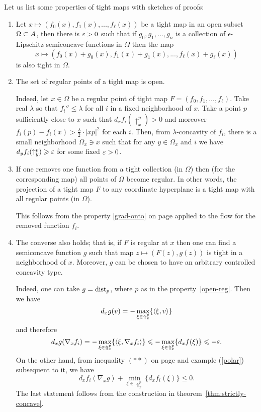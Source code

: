 \documentclass{article}
\begin{document}
Let us list some properties of tight maps with sketches of proofs:
\begin{enumerate}
\item\label{lip+} 
Let $x\mapsto(f_0(x),f_1(x),...,f_\ell(x))$ be a tight map in an open subset $\Omega\subset A$, then there is $\varepsilon>0$ such that if $g_0,g_1,...,g_n$ is a collection of
$\epsilon$-Lipschitz semiconcave functions in $\Omega$ then the map 
$$x\mapsto (f_0(x)+g_0(x),f_1(x)+g_1(x),...,f_\ell(x)+g_\ell(x))$$
is also tight in $\Omega$.
\item \label{open-reg}The set of regular points of a tight map is open. 

Indeed, let $x\in\Omega$ be a regular point of tight map $F=(f_0,f_1,\dots,f_\ell)$. 
Take real $\lambda$ so that $f_i''\le \lambda$ for all $i$ in a fixed neighborhood of
$x$.
Take a point $p$ sufficiently close to $x$ such that $d_x f_i(\uparrow_x^p)>0$
and moreover $f_i(p)-f_i(x)>\tfrac\lambda2{\cdot}
|x p|^2$ for each $i$.
Then, from $\lambda$-concavity of $f_i$, there is a small neighborhood
$\Omega_x\ni x$ such that for any $y\in\Omega_x$ and $i$ we have $d_y
f_i(\uparrow_y^p)\geqslant\varepsilon$
for some fixed $\varepsilon>0$.

\item \label{minus-funct}If one removes one function from a tight
collection (in $\Omega$) then (for the corresponding map) all points of $\Omega$ become
regular. 
In other words, the projection of a tight map $F$ to any coordinate
hyperplane is a tight map with all regular points (in $\Omega$).

This follows from the property \ref{grad-onto} on page \pageref{grad-onto}
applied to the flow for the removed function $f_i$.

\item \label{extra-funct} 
The converse also holds;
that is,
if $F$ is regular at $x$ then
one can find a semiconcave function $g$ such that map $z\mapsto(F(z),g(z))$ is
tight in a neighborhood of $x$.
Moreover, $g$ can be chosen to have an arbitrary controlled concavity type.

Indeed, one can take $g=\operatorname{dist}_p$, where $p$ as in the property~\ref{open-reg}.
Then we have 
$$d_x g(v)=-\max_{\xi\in\Uparrow_x^p}\{\langle\xi,v\rangle\}$$
and therefore
$$d_x g(\nabla_x f_i)
=
-\max_{\xi\in\Uparrow_x^p}\{\langle\xi,\nabla_x f_i\rangle\}
\leqslant
-\max_{\xi\in\Uparrow_x^p} \{d_x f(\xi)\}
\leqslant
-\varepsilon.$$
On the other hand, from inequality $(**)$  on page \pageref{**-polar-inq} and
example (\ref{polar}) subsequent to it, we have
$$d_x f_i(\nabla_x g)+\min_{\xi\in\Uparrow_x^p}\{d_x f_i(\xi)\}\le 0.$$
The last statement follows from the construction in
theorem~\ref{thm:strictly-concave}. 


\end{enumerate}
\end{document}
